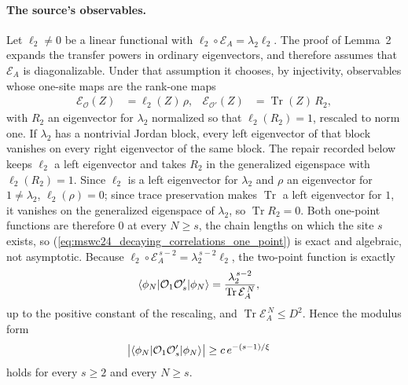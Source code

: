 \documentclass{article}
\begin{document}
\paragraph{The source's observables.}
Let $\ell_2\neq0$ be a linear functional with
$\ell_2\circ\mathcal E_A=\lambda_2\ell_2$. The proof of Lemma~2 expands the
transfer powers in ordinary eigenvectors, and therefore assumes that
$\mathcal E_A$ is diagonalizable. Under that assumption it chooses, by
injectivity, observables whose one-site maps are the rank-one maps
\begin{align}
    \mathcal E_{\mathcal O}(Z)
     & =\ell_2(Z)\,\rho,
     &
    \mathcal E_{\mathcal O'}(Z)
     & =\operatorname{Tr}(Z)\,R_2,
    \label{eq:mswc24_decaying_correlations_source_choice}
\end{align}
with $R_2$ an eigenvector for $\lambda_2$ normalized so that $\ell_2(R_2)=1$,
rescaled to norm one. If $\lambda_2$ has a nontrivial Jordan block, every
left eigenvector of that block vanishes on every right eigenvector of the
same block. The repair recorded below keeps
$\ell_2$ a left eigenvector and takes $R_2$ in the generalized eigenspace with
$\ell_2(R_2)=1$. Since $\ell_2$ is a left eigenvector for $\lambda_2$
and $\rho$ an eigenvector for $1\neq\lambda_2$, $\ell_2(\rho)=0$; since
trace preservation makes $\operatorname{Tr}$ a left eigenvector for $1$, it
vanishes on the generalized eigenspace of $\lambda_2$, so
$\operatorname{Tr}R_2=0$. Both one-point functions are therefore $0$ at every
$N\ge s$, the chain lengths on which the site $s$ exists, so
(\ref{eq:mswc24_decaying_correlations_one_point}) is exact and algebraic, not
asymptotic. Because $\ell_2\circ\mathcal E_A^{\,s-2}=\lambda_2^{\,s-2}\ell_2$, the
two-point function is exactly
\begin{align}
    \langle \phi_N|\mathcal O_1\mathcal O'_s|\phi_N\rangle
     & =\frac{\lambda_2^{\,s-2}}{\operatorname{Tr}\mathcal E_A^{\,N}},
    \label{eq:mswc24_decaying_correlations_exact}
\end{align}
up to the positive constant of the rescaling, and
$\operatorname{Tr}\mathcal E_A^{\,N}\le D^2$. Hence the modulus form
\begin{align}
    \bigl\lvert\langle \phi_N|\mathcal O_1\mathcal O'_s|\phi_N\rangle\bigr\rvert
     & \ge c\,e^{-(s-1)/\xi}
    \label{eq:mswc24_decaying_correlations_modulus}
\end{align}
holds for every $s\ge2$ and every $N\ge s$.
\end{document}
